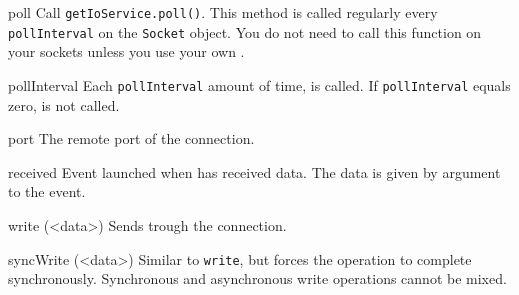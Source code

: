 \begin{urbiscriptapi}
\item[poll]
  Call \lstinline|getIoService.poll()|. This method is called regularly every
  \lstinline|pollInterval| on the \lstinline|Socket| object. You do not need
  to call this function on your sockets unless you use your own
  .

\item[pollInterval] Each \lstinline|pollInterval| amount of time,
   is called. If \lstinline|pollInterval| equals zero,
   is not called.

\item[port]
  The remote port of the connection.

\item[received]
  Event launched when \this has received data. The data is
  given by argument to the event.

\item[write](<data>)%
  Sends  trough the connection.

\item[syncWrite](<data>)%
  Similar to \lstinline|write|, but forces the operation to complete
  synchronously. Synchronous and asynchronous write operations cannot be mixed.

\end{urbiscriptapi}

